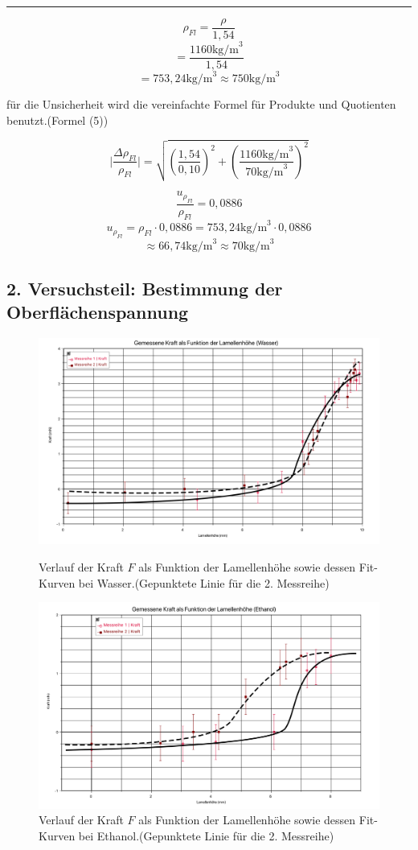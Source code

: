 \documentclass[11pt,a4paper]{article} %
\begin{document}
\hrule
\begin{tcolorbox}[colback=white]
$$\rho_{Fl}=\frac{\rho}{1,54}$$
$$=\frac{1160 \textrm{kg/m}^3 }{1,54}$$
$$=753,24 \textrm{kg/m}^3\approx 750 \textrm{kg/m}^3$$

für die Unsicherheit wird die vereinfachte Formel für Produkte und Quotienten benutzt.(Formel (5))


$$\vert\frac{\Delta{\rho_{Fl}}}{\rho_{Fl}}\vert = \sqrt{(\frac{1,54}{0,10})^2+(\frac{1160 \textrm{kg/m}^3}{70\textrm{kg/m}^3})^2}$$

$$\frac{u_{\rho_{Fl}}}{\rho_{Fl}} = 0,0886$$
$$u_{\rho_{Fl}}={\rho_{Fl}}\cdot0,0886=753,24\textrm{kg/m}^3\cdot0,0886$$
$$\approx66,74\textrm{kg/m}^3\approx70\textrm{kg/m}^3$$
\end{tcolorbox}


\subsection{2. Versuchsteil: Bestimmung der Oberflächenspannung}
\newpage
\begin{figure}[h!]
\includegraphics[width=\textwidth]{ex4gr1}
\caption{Verlauf der Kraft $F$ als Funktion der Lamellenhöhe sowie dessen Fit-Kurven bei Wasser.(Gepunktete Linie für die 2. Messreihe)}

\includegraphics[width=\textwidth]{ex4gr2}
\caption{Verlauf der Kraft $F$ als Funktion der Lamellenhöhe sowie dessen Fit-Kurven bei Ethanol.(Gepunktete Linie für die 2. Messreihe)}
\end{figure}
\newpage
\end{document}
